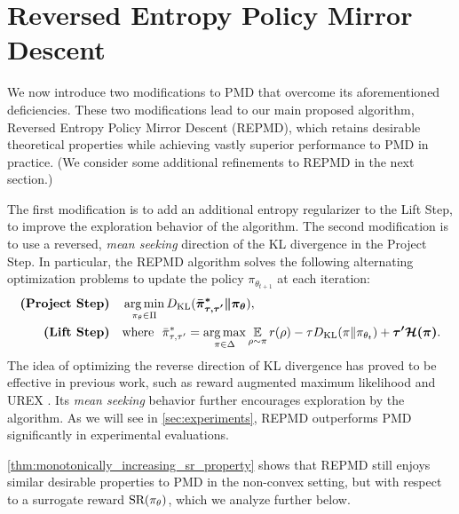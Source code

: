 

\section{Reversed Entropy Policy Mirror Descent}
\label{subsec:repmd}

We now introduce two modifications to PMD that overcome 
its aforementioned deficiencies.
These two modifications lead to our main proposed algorithm,
Reversed Entropy Policy Mirror Descent (REPMD),
which retains desirable theoretical properties while achieving
vastly superior performance to PMD in practice.
(We consider some additional refinements to REPMD in the next section.)

The first modification is to add an additional entropy regularizer
to the Lift Step,
to improve the exploration behavior of the algorithm. 
The second modification is to use a reversed, \emph{mean seeking} direction
of the KL divergence in the Project Step.
In particular, the REPMD algorithm solves the following 
alternating
optimization problems to update the policy $\pi_{\theta_{t+1}}$
at each iteration:
%
\begin{equation}
\label{eq:repmd}
\begin{split}
\text{\bf (Project Step)} \quad  &\argmin\limits_{\pi_\theta \in \Pi}{\KL(\bm{ \bar{\pi}_{\tau,\tau^{\prime}}^* \| \pi_\theta }) }, \\
\text{\bf (Lift Step)} \quad  & \text{where}\ \ \bar{\pi}_{\tau,\tau^{\prime}}^*  =  \argmax\limits_{\pi \in \Delta}{ \ep\limits_{\rho \sim \pi}{  r(\rho)  - \tau \KL(\pi \| \pi_{\theta_t}) + \bm{\tau^{\prime} \cH(\pi)} }}.
\end{split}
\end{equation}
%
The idea of optimizing the reverse direction of KL divergence has proved
to be effective in previous work,
such as reward augmented maximum likelihood \citep{norouzi2016reward}
and UREX \citep{nachum2017improving}.
Its \emph{mean seeking} behavior further encourages exploration by the
algorithm.
As we will see in \cref{sec:experiments},
REPMD outperforms PMD significantly in experimental evaluations.

\cref{thm:monotonically_increasing_sr_property}
shows that REPMD still enjoys similar desirable properties to PMD
in the non-convex setting,
but with respect to a surrogate reward $\text{SR}(\pi_\theta)$,
which we analyze further below.

